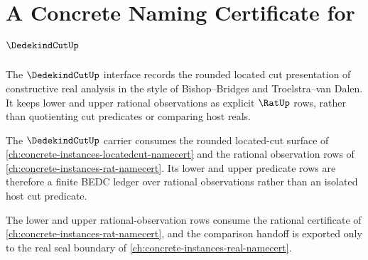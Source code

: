 \chapter{A Concrete Naming Certificate for $\DedekindCutUp$}
\label{ch:concrete-instances-dedekindcut-namecert}

The $\DedekindCutUp$ interface records the rounded located cut presentation of constructive real analysis in the style of Bishop--Bridges and Troelstra--van Dalen. It keeps lower and upper rational observations as explicit $\RatUp$ rows, rather than quotienting cut predicates or comparing host reals.

The $\DedekindCutUp$ carrier consumes the rounded located-cut surface of \autoref{ch:concrete-instances-locatedcut-namecert} and the rational observation rows of \autoref{ch:concrete-instances-rat-namecert}. Its lower and upper predicate rows are therefore a finite BEDC ledger over rational observations rather than an isolated host cut predicate.

The lower and upper rational-observation rows consume the rational certificate of \autoref{ch:concrete-instances-rat-namecert}, and the comparison handoff is exported only to the real seal boundary of \autoref{ch:concrete-instances-real-namecert}.

